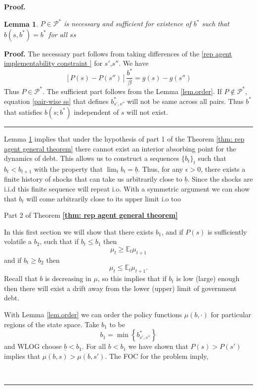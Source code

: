 \documentclass[thmsb,11pt]{article}
\newtheorem{lemma}{Lemma}
\newcommand{\EE}{\mathbb E}
\newenvironment{proof}[1][Proof]{\noindent \textbf{#1.} }{\  \rule{0.5em}{0.5em}}
\begin{document}
\begin{proof}
\begin{lemma}
\label{lem: existence and uniqueness of ss}
$P \in \mathcal{P}^*$ is necessary and sufficient for existence of $b^*$ such that $b(s,b^*)=b^*$ for all $s$s
\end{lemma}

\begin{proof}
The necessary part follows from taking differences of the \eqref{rep agent implementability constraint } for $s'$,$s''$. We have
\[[P(s)-P(s'')]\frac{b^*}{\beta}=g(s)-g(s'')\]
Thus $P\in\mathcal{P}^*$. The sufficient part follows from the Lemma \ref{lem.order}. If $P \not \in \mathcal{P}^*$, equation \eqref{pair-wise ss} that defines $b^*_{s',s''}$ will not be same across all pairs. Thus $b^*$ that satisfies $b(s;b^*)$ independent of $s$ will not exist.
\end{proof}


Lemma  \ref{lem: existence and uniqueness of ss}  implies that under the hypothesis of part 1 of the Theorem \ref{thm: rep agent general theorem} there cannot exist an interior absorbing point for the dynamics of debt. This allows us to construct a sequences $\{b_t\}_t $ such that $b_t<b_{t+1}$ with the property that $\lim_tb_t=\underline{b}$.
Thus, for any $\epsilon>0$, there exists a finite history of shocks that can take us arbitrarily close to $\underline{b}$. Since the shocks are i.i.d this finite sequence will repeat i.o. With a symmetric argument we can show that $b_t$ will come arbitrarily close to its upper limit i.o too





{Part 2 of Theorem \textbf{\ref{thm: rep agent general theorem}}}


In this first section we will show that there exists $b_1$, and if $P(s)$ is sufficiently volatile a $b_2$, such that if $b_t\leq b_1$ then
\[
	\mu_t \geq \EE_t \mu_{t+1}
\] and if $b_t \geq b_2$ then
\[
	\mu_t \leq \EE_t \mu_{t+1}.
\]  Recall that $b$ is decreasing in $\mu$, so this implies that if $b_t$ is low (large) enough then there will exist a drift away from the lower (upper) limit of government debt.

With Lemma \ref{lem.order} we can order the policy functions $\mu(b,\cdot)$ for particular regions of the state space.  Take $b_1$ to be
\[
	b_1 = \min\left\{b^*_{s',s''}\right\}
\] and WLOG choose $\underline b < b_1$.  For all $b < b_1$ we have shown that $P(s) > P(s')$ implies that $\mu(b,s) > \mu(b,s')$.  The FOC for the problem imply,


\end{proof}
\end{document}
